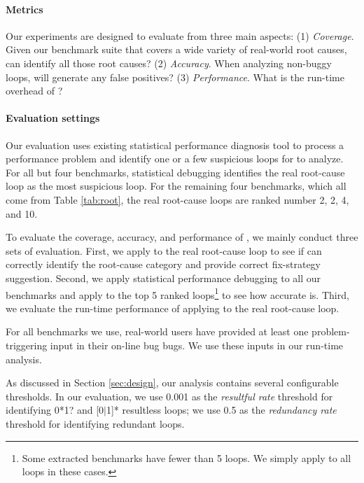 \paragraph{Metrics}
Our experiments are designed to evaluate \Tool from three main aspects:
(1) 
\textit{Coverage}. Given our benchmark suite that covers a wide variety
of real-world root causes, can \Tool identify all those root causes?
(2)
\textit{Accuracy}. 
When analyzing non-buggy loops, will \Tool generate any false positives?
(3) 
\textit{Performance}.
What is the run-time overhead of \Tool?

\paragraph{Evaluation settings}
Our evaluation uses existing statistical performance diagnosis
tool \cite{SongOOPSLA2014} to process a performance problem and identify 
one or a few suspicious loops for \Tool to analyze.
For all but four benchmarks, statistical debugging identifies the
real root-cause loop as the most suspicious loop. For the remaining four
benchmarks, which all come from Table \ref{tab:root},
the real root-cause loops are ranked number 2, 2, 4, and 10.

%

To evaluate the coverage, accuracy, and performance of \Tool, we mainly conduct
three sets of evaluation. First, we apply \Tool to the real root-cause loop to
see if \Tool can correctly identify the root-cause category and provide
correct fix-strategy suggestion. Second, we apply
statistical performance debugging \cite{SongOOPSLA2014} to all our benchmarks
and apply \Tool to the top 5 ranked loops\footnote{Some extracted benchmarks
have fewer than 5 loops. We simply apply \Tool to all loops in these cases.}
to see how accurate \Tool is. Third, we evaluate the run-time performance of
applying \Tool to the real root-cause loop. 
 
For all benchmarks we use, real-world
users have provided at least one problem-triggering input in their on-line 
bug bugs. We use these inputs in our run-time analysis.

As discussed in Section \ref{sec:design}, our analysis contains 
several configurable thresholds. In our evaluation,
we use 0.001 as the \textit{resultful rate} threshold for identifying
0*1? 
and [0$|$1]* resultless loops; we use 
0.5 as the \textit{redundancy rate} threshold for identifying redundant loops.

